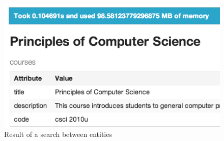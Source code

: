 	\begin{figure}[H]
		\centering
		\includegraphics[scale=0.5]{figures/images/step-5}
		
		\caption{Result of a search between entities}
		\label{fig:webui-step-5}
	\end{figure}